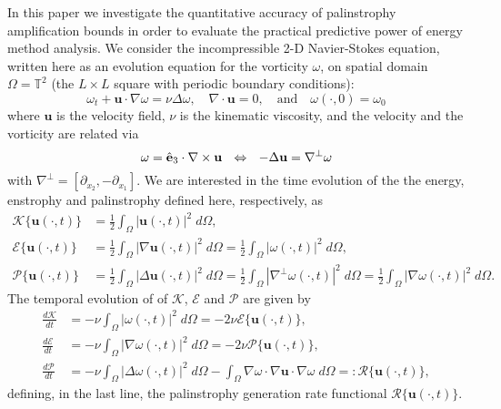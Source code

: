\documentclass[11pt]{article}
\def\E{{\mathcal{E}}}
\def\P{{\mathcal{P}}}
\def\R{{\mathcal{R}}}
\def\K{{\mathcal{K}}}
\newcommand{\uvec}{\mathbf{u}}
\newcommand{\laplacian}{\Delta}
\newcommand{\nablaperp}{\nabla^{\perp}}
\begin{document}
In this paper we investigate the quantitative accuracy of palinstrophy amplification bounds in order to evaluate the practical predictive power of energy method analysis.
We consider the incompressible 2-D Navier-Stokes equation, written here as an evolution equation for the vorticity $\omega$, on spatial domain $\Omega = \mathbb{T}^2$ (the $L \times L$ square with periodic boundary conditions):
\begin{equation}\label{eq:2DNSE}
\omega_t + \uvec\cdot\nabla\omega = \nu\laplacian\omega, \quad
\nabla\cdot\uvec = 0, \quad \text{and} \quad \omega(\cdot,0) = \omega_0
\end{equation}
where $\uvec$ is the velocity field, $\nu$ is the kinematic viscosity, and the velocity and the vorticity are related via
\begin{equation*}
\omega = {\hat {\bf e}}_3 \cdot \nabla \times \uvec \ \  \Leftrightarrow \ \ -\laplacian\uvec = \nablaperp\omega
\end{equation*}
with $\nablaperp = \left[\partial_{x_2},-\partial_{x_1}\right]$.
We are interested in the time evolution of the the energy, enstrophy and palinstrophy defined here, respectively, as
\begin{subequations}\label{eq:Q_defn}
\begin{align}
\K\{\uvec(\cdot,t)\} & = \frac{1}{2}\int_\Omega | \uvec(\cdot,t) |^2 \;d\Omega, \\
\E\{\uvec(\cdot,t)\} & = \frac{1}{2}\int_\Omega | \nabla\uvec(\cdot,t) |^2 \;d\Omega = \frac{1}{2}\int_\Omega | \omega(\cdot,t) |^2 \;d\Omega,\\
\P\{\uvec(\cdot,t)\} & = \frac{1}{2}\int_\Omega | \laplacian\uvec(\cdot,t) |^2\;d\Omega = \frac{1}{2}\int_\Omega | \nablaperp\omega(\cdot,t) |^2 \;d\Omega = \frac{1}{2}\int_\Omega | \nabla\omega(\cdot,t) |^2 \;d\Omega.
\end{align}
\end{subequations}    
The temporal evolution of of $\K$, $\E$ and $\P$ are given by
\begin{subequations}\label{eq:dQdt_defn}
\begin{align}
\frac{d\K}{dt} & = -\nu\int_\Omega | \omega(\cdot,t) |^2 \;d\Omega = -2\nu\E\{\uvec(\cdot,t)\}, \label{eq:dKdt_defn} \\
\frac{d\E}{dt} & = -\nu\int_\Omega | \nabla\omega(\cdot,t) |^2 \;d\Omega = -2\nu\P\{\uvec(\cdot,t)\}, \label{eq:dEdt_defn}\\
\frac{d\P}{dt} & = -\nu\int_\Omega | \laplacian\omega(\cdot,t) |^2\;d\Omega - 
\int_{\Omega}\nabla\omega\cdot\nabla\uvec\cdot\nabla\omega \;d\Omega =: \R\{\uvec(\cdot,t)\}, \label{eq:dPdt_defn}
\end{align}
\end{subequations}    
defining, in the last line, the palinstrophy generation rate functional $\R\{\uvec(\cdot,t)\}$.
\end{document}
